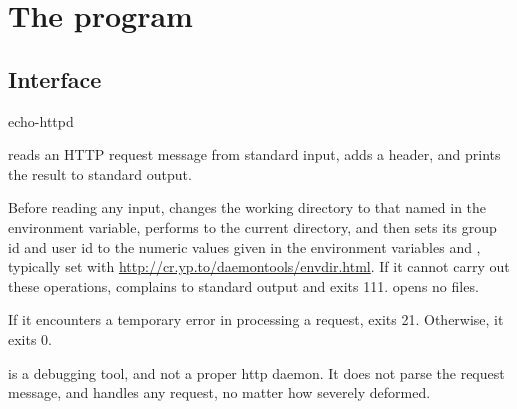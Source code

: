 
\chapter{The  program}

\section{Interface}
\begin{code}
  echo-httpd
\end{code}

 reads an HTTP request message from standard input,
adds a header, and prints the result to standard output.

Before reading any input,  changes the working
directory to that named in the  environment variable,
performs  to the current directory, and then sets its
group id and user id to the numeric values given in the environment
variables  and , typically set with
\href{\cmd{envdir}}{http://cr.yp.to/daemontools/envdir.html}.
If it cannot carry out these operations,  complains to
standard output and exits 111.   opens no files.

If it encounters a temporary error in processing a request,
 exits 21.  Otherwise, it exits 0.

 is a debugging tool, and not a proper http daemon.
It does not parse the request message, and handles any request, no
matter how severely deformed.

